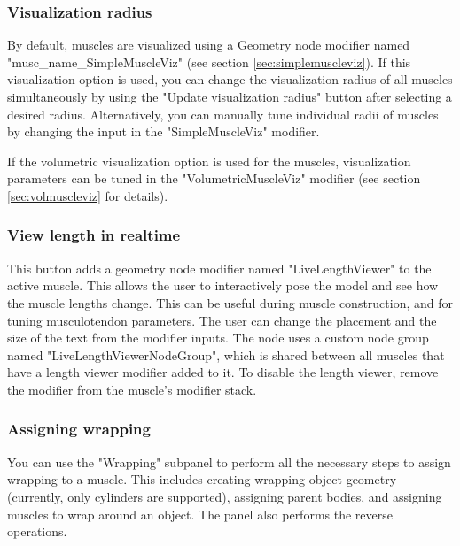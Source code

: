 \documentclass{article}
\begin{document}
\subsubsection{Visualization radius}
By default, muscles are visualized using a Geometry node modifier named "musc\_name\_SimpleMuscleViz" (see section \ref{sec:simplemuscleviz}). If this visualization option is used, you can change the visualization radius of all muscles simultaneously by using the "Update visualization radius" button after selecting a desired radius. Alternatively, you can manually tune individual radii of muscles by changing the input in the "SimpleMuscleViz" modifier.

If the volumetric visualization option is used for the muscles, visualization parameters can be tuned in the "VolumetricMuscleViz" modifier (see section \ref{sec:volmuscleviz} for details).

\subsubsection{View length in realtime}

This button adds a geometry node modifier named "LiveLengthViewer" to the active muscle. This allows the user to interactively pose the model and see how the muscle lengths change. This can be useful during muscle construction, and for tuning musculotendon parameters. The user can change the placement and the size of the text from the modifier inputs. %
The node uses a custom node group named "LiveLengthViewerNodeGroup", which is shared between all muscles that have a length viewer modifier added to it. To disable the length viewer, remove the modifier from the muscle's modifier stack.


\subsubsection{Assigning wrapping}

You can use the "Wrapping" subpanel to perform all the necessary steps to assign wrapping to a muscle. This includes creating wrapping object geometry (currently, only cylinders are supported), assigning parent bodies, and assigning muscles to wrap around an object. The panel also performs the reverse operations. 
\end{document}
